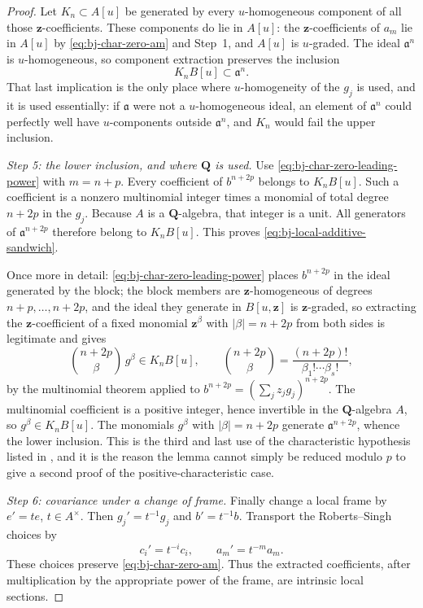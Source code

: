 \begin{proof}
Let $K_n\subset A[u]$ be generated by every $u$-homogeneous component of
all those $\mathbf z$-coefficients.
These components do lie in $A[u]$: the $\mathbf z$-coefficients of
$a_m$ lie in $A[u]$ by \eqref{eq:bj-char-zero-am} and Step~1, and
$A[u]$ is $u$-graded.
The ideal $\mathfrak a^n$ is $u$-homogeneous, so component extraction
preserves the inclusion
\[
                         K_nB[u]\subset\mathfrak a^n.
\]
That last implication is the only place where $u$-homogeneity of the
$g_j$ is used, and it is used essentially: if $\mathfrak a$ were not a
$u$-homogeneous ideal, an element of $\mathfrak a^n$ could perfectly
well have $u$-components outside $\mathfrak a^n$, and $K_n$ would fail
the upper inclusion.

\emph{Step 5: the lower inclusion, and where $\mathbf Q$ is used.}
Use \eqref{eq:bj-char-zero-leading-power} with $m=n+p$.
Every coefficient of $b^{n+2p}$ belongs to $K_nB[u]$.
Such a coefficient is a nonzero multinomial integer times a monomial of total
degree $n+2p$ in the $g_j$.
Because $A$ is a $\mathbf Q$-algebra, that integer is a unit.
All generators of $\mathfrak a^{n+2p}$ therefore belong to $K_nB[u]$.
This proves \eqref{eq:bj-local-additive-sandwich}.

Once more in detail: \eqref{eq:bj-char-zero-leading-power} places
$b^{n+2p}$ in the ideal generated by the block; the block members are
$\mathbf z$-homogeneous of degrees $n+p,\ldots,n+2p$, and the ideal they
generate in $B[u,\mathbf z]$ is $\mathbf z$-graded, so extracting the
$\mathbf z$-coefficient of a fixed monomial $\mathbf z^\beta$ with
$|\beta|=n+2p$ from both sides is legitimate and gives
\[
 \binom{n+2p}{\beta}\,g^\beta\in K_nB[u],
 \qquad
 \binom{n+2p}{\beta}=\frac{(n+2p)!}{\beta_1!\cdots\beta_s!},
\]
by the multinomial theorem applied to $b^{n+2p}=(\sum_jz_jg_j)^{n+2p}$.
The multinomial coefficient is a positive integer, hence invertible in the
$\mathbf Q$-algebra $A$, so $g^\beta\in K_nB[u]$.  The monomials
$g^\beta$ with $|\beta|=n+2p$ generate $\mathfrak a^{n+2p}$, whence
the lower inclusion.  This is the third and last use of the characteristic
hypothesis listed in , and it is the reason the
lemma cannot simply be reduced modulo $p$ to give a second proof of the
positive-characteristic case.

\emph{Step 6: covariance under a change of frame.}
Finally change a local frame by $e'=te$, $t\in A^\times$.
Then $g_j'=t^{-1}g_j$ and $b'=t^{-1}b$.
Transport the Roberts--Singh choices by
\[
                         c_i'=t^{-i}c_i,
             \qquad
                         a_m'=t^{-m}a_m.
\tag{44.9}\label{eq:bj-char-zero-frame-law}
\]
These choices preserve \eqref{eq:bj-char-zero-am}.
Thus the extracted coefficients, after multiplication by the appropriate
power of the frame, are intrinsic local sections.


\end{proof}
